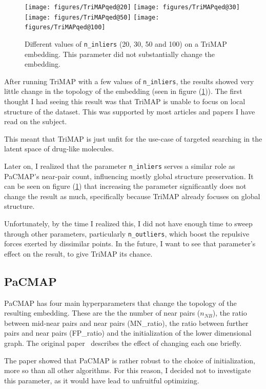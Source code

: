 \begin{figure}[!h]
	\centering
	\texttt{[image: figures/TriMAPqed@20]}
	\texttt{[image: figures/TriMAPqed@30]}
	\texttt{[image: figures/TriMAPqed@50]}
	\texttt{[image: figures/TriMAPqed@100]}
	\caption{Different values of \texttt{n\_inliers} (20, 30, 50 and 100) on a TriMAP embedding. This parameter did not substantially change the embedding.}
	\label{fig:trimap:n_inliers}
\end{figure}

After running TriMAP with a few values of \texttt{n\_inliers}, the results showed very little change in the topology of the embedding (seen in figure (\ref{fig:trimap:n_inliers})). The first thought I had seeing this result was that TriMAP is unable to focus on local structure of the dataset. This was supported by most articles and papers I have read on the subject. 

This meant that TriMAP is just unfit for the use-case of targeted searching in the latent space of drug-like molecules. 

Later on, I realized that the parameter \texttt{n\_inliers} serves a similar role as PaCMAP's near-pair count, influencing mostly global structure preservation. It can be seen on figure (\ref{fig:trimap:n_inliers}) that increasing the parameter significantly does not change the result as much, specifically because TriMAP already focuses on global structure.

Unfortunately, by the time I realized this, I did not have enough time to sweep through other parameters, particularly \texttt{n\_outliers}, which boost the repulsive forces exerted by dissimilar points. In the future, I want to see that parameter's effect on the result, to give TriMAP its chance.

\subsection{PaCMAP}

PaCMAP has four main hyperparameters that change the topology of the resulting embedding. These are the the number of near pairs ($n_{NB}$), the ratio between mid-near pairs and near pairs (MN\_ratio), the ratio between further pairs and near pairs (FP\_ratio) and the initialization of the lower dimensional graph. The original paper~\cite{bib:pacmap} describes the effect of changing each one briefly. 

The paper showed that PaCMAP is rather robust to the choice of initialization, more so than all other algorithms. For this reason, I decided not to investigate this parameter, as it would have lead to unfruitful optimizing.

